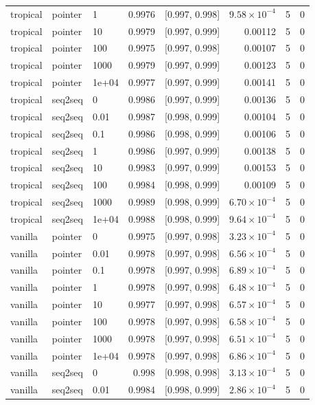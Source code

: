 \documentclass[10pt]{article}
\begin{document}
{\begin{longtable}{lllrlrrr}
tropical & pointer & 1 & 0.9976 & [0.997, 0.998] & $9.58\times10^{-4}$ & 5 & 0\\
tropical & pointer & 10 & 0.9979 & [0.997, 0.999] & 0.00112 & 5 & 0\\
tropical & pointer & 100 & 0.9975 & [0.997, 0.998] & 0.00107 & 5 & 0\\
tropical & pointer & 1000 & 0.9979 & [0.997, 0.999] & 0.00123 & 5 & 0\\
tropical & pointer & 1e+04 & 0.9977 & [0.997, 0.999] & 0.00141 & 5 & 0\\
tropical & seq2seq & 0 & 0.9986 & [0.997, 0.999] & 0.00136 & 5 & 0\\
tropical & seq2seq & 0.01 & 0.9987 & [0.998, 0.999] & 0.00104 & 5 & 0\\
tropical & seq2seq & 0.1 & 0.9986 & [0.998, 0.999] & 0.00106 & 5 & 0\\
tropical & seq2seq & 1 & 0.9986 & [0.997, 0.999] & 0.00138 & 5 & 0\\
tropical & seq2seq & 10 & 0.9983 & [0.997, 0.999] & 0.00153 & 5 & 0\\
tropical & seq2seq & 100 & 0.9984 & [0.998, 0.999] & 0.00109 & 5 & 0\\
tropical & seq2seq & 1000 & 0.9989 & [0.998, 0.999] & $6.70\times10^{-4}$ & 5 & 0\\
tropical & seq2seq & 1e+04 & 0.9988 & [0.998, 0.999] & $9.64\times10^{-4}$ & 5 & 0\\
vanilla & pointer & 0 & 0.9975 & [0.997, 0.998] & $3.23\times10^{-4}$ & 5 & 0\\
vanilla & pointer & 0.01 & 0.9978 & [0.997, 0.998] & $6.56\times10^{-4}$ & 5 & 0\\
vanilla & pointer & 0.1 & 0.9978 & [0.997, 0.998] & $6.89\times10^{-4}$ & 5 & 0\\
vanilla & pointer & 1 & 0.9978 & [0.997, 0.998] & $6.48\times10^{-4}$ & 5 & 0\\
vanilla & pointer & 10 & 0.9977 & [0.997, 0.998] & $6.57\times10^{-4}$ & 5 & 0\\
vanilla & pointer & 100 & 0.9978 & [0.997, 0.998] & $6.58\times10^{-4}$ & 5 & 0\\
vanilla & pointer & 1000 & 0.9978 & [0.997, 0.998] & $6.51\times10^{-4}$ & 5 & 0\\
vanilla & pointer & 1e+04 & 0.9978 & [0.997, 0.998] & $6.86\times10^{-4}$ & 5 & 0\\
vanilla & seq2seq & 0 & 0.998 & [0.998, 0.998] & $3.13\times10^{-4}$ & 5 & 0\\
vanilla & seq2seq & 0.01 & 0.9984 & [0.998, 0.999] & $2.86\times10^{-4}$ & 5 & 0\\

\end{longtable}}
\end{document}
